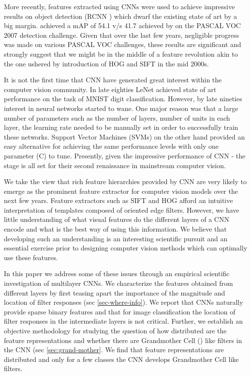 \documentclass[runningheads]{llncs}
\begin{document}
More recently, features extracted using CNNs were used to achieve impressive results on object detection (RCNN \cite{Rcnn}) which dwarf the existing state of art by a big margin. \cite{Rcnn} achieved a mAP of 54.1 v/s 41.7 achieved by \cite{regionlets} on the PASCAL VOC 2007 detection challenge. Given that over the last few years, negligible progress was made on various PASCAL VOC challenges, these results are significant and strongly suggest that we might be in the middle of a feature revolution akin to the one ushered by introduction of HOG \cite{Hog} and SIFT \cite{Sift} in the mid 2000s.  

It is not the first time that CNN have generated great interest within the computer vision community. In late eighties LeNet\cite{Lecun89} achieved state of art performance on the task of MNIST digit classification. However, by late nineties interest in neural networks started to wane. One major reason was that a large number of parameters such as the number of layers, number of units in each layer, the learning rate needed to be manually set in order to successfully train these networks. Support Vector Machines (SVMs) on the other hand provided an easy alternative for achieving the same performance levels with only one parameter (C) to tune. Presently, given the impressive performance of CNN \cite{Kriz, Decaf, Rcnn} - the stage is all set for their second renaissance in mainstream computer vision. 

We take the view that rich feature hierarchies provided by CNN are very likely to emerge as the prominent feature extractor for computer vision models over the next few years. Feature extractors such as SIFT and HOG afford an intuitive interpretation of templates composed of oriented edge filters. However, we have little understanding of what visual features do the different layers of a CNN encode and what is the best way of using this information. We believe that developing such an understanding is an interesting scientific pursuit and an essential exercise prior to designing computer vision methods which can optimally use these features.

In this paper we address some of these issues through an empirical scientific investigation of multilayer CNNs. We characterize the features obtained from different layers by first teasing apart the importance of the magnitude and location of filter responses (sec \ref{sec-where-info}). We report that CNNs naturally provide sparse binary features and that for image classification the location of filter responses in the intermediate layers is not critical. Further, we establish an objective methodology for studying the question of how distributed are the feature representations and whether there are Grandmother Cell (\cite{Barlow, Grandmother}) like filters in the CNN  (sec \ref{sec:grand-mother}. We find that feature representations are distributed and only for a few classes the CNN develops Grandmother Cell like filters.  
\end{document}
